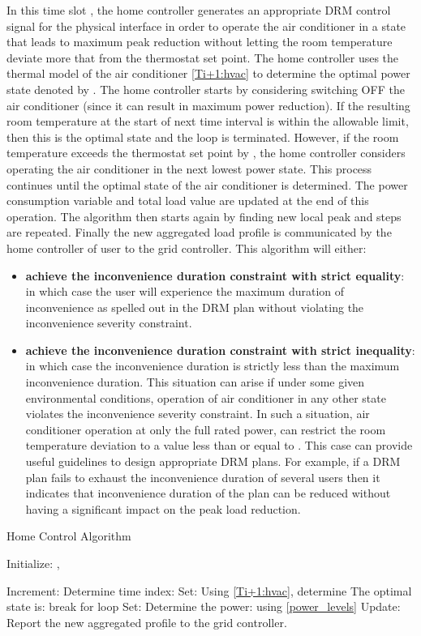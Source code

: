 \documentclass[10pt,twocolumn,twoside]{IEEEtran}
\begin{document}
In this time slot , the home controller generates an appropriate DRM control signal for the physical interface in order to operate the air conditioner in a state that leads to maximum peak reduction without letting the room temperature deviate more that  from the thermostat set point. The home controller uses the thermal model of the air conditioner \eqref{Ti+1:hvac} to determine the optimal power state denoted by . The home controller starts by considering switching OFF the air conditioner (since it can result in maximum power reduction). If the resulting room temperature at the start of next time interval is within the allowable limit, then this is the optimal state and the loop is terminated. However, if the room temperature exceeds the thermostat set point by , the home controller considers operating the air conditioner in the next lowest power state. This process continues until the optimal state of the air conditioner is determined. The power consumption variable and total load value are updated at the end of this operation. The algorithm then starts again by finding new local peak and steps are repeated. Finally the new aggregated load profile is communicated by the home controller of user  to the grid controller.
This algorithm will either: 
\begin{itemize}
	\item \textbf{achieve the inconvenience duration constraint with strict equality}: in which case the user will experience the maximum duration of inconvenience as spelled out in the DRM plan without violating the inconvenience severity constraint.
	\item \textbf{achieve the inconvenience duration constraint with strict inequality}: in which case the inconvenience duration is strictly less than the maximum inconvenience duration. This situation can arise if under some given environmental conditions, operation of air conditioner in any other state  violates the inconvenience severity constraint. In such a situation, air conditioner operation at only the full rated power, can restrict the room temperature deviation to a value less than or equal to . This case can provide useful guidelines to design appropriate DRM plans. For example, if a DRM plan fails to exhaust the inconvenience duration of several users then it indicates that inconvenience duration of the plan can be reduced without having a significant impact on the peak load reduction.
\end{itemize}

\begin{algorithm}[htb]
\caption{Home Control Algorithm}
\label{alg:home}
Initialize: , \\

\begin{algorithmic}[1]
\FOR{}
\STATE Increment: 
\STATE Determine time index: 
\FOR{}
\STATE Set: 
\STATE Using \eqref{Ti+1:hvac}, determine  
\IF{}
\STATE The optimal state is: 
\STATE break for loop
\ELSE 
\STATE Set: 
\ENDIF
\ENDFOR
\STATE Determine the power:  using \eqref{power_levels}
\STATE Update: 
\ENDFOR
\STATE Report the new aggregated profile to the grid controller.
\end{algorithmic}
\end{algorithm}
\end{document}
